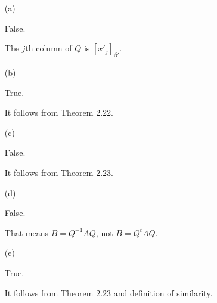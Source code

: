 \begin{Exercise}
	\begin{enumerate}[(a)]
		\item[(a)]
		\begin{answer}
			False.
		\end{answer}
		\begin{solution}
			The $j$th column of $Q$ is $[x'_j]_{\beta'}$.
		\end{solution}
		
		\item[(b)]
		\begin{answer}
			True.
		\end{answer}
		\begin{solution}
			It follows from Theorem 2.22.
		\end{solution}
		
		\item[(c)]
		\begin{answer}
			False.
		\end{answer}
		\begin{solution}
			It follows from Theorem 2.23.
		\end{solution}
		
		\item[(d)]
		\begin{answer}
			False.
		\end{answer}
		\begin{solution}
			That means $B = Q^{-1} A Q$, not $B = Q^t A Q$.
		\end{solution}
		
		\item[(e)]
		\begin{answer}
			True.
		\end{answer}
		\begin{solution}
			It follows from Theorem 2.23 and definition of similarity.
		\end{solution}
		
	\end{enumerate}
\end{Exercise}